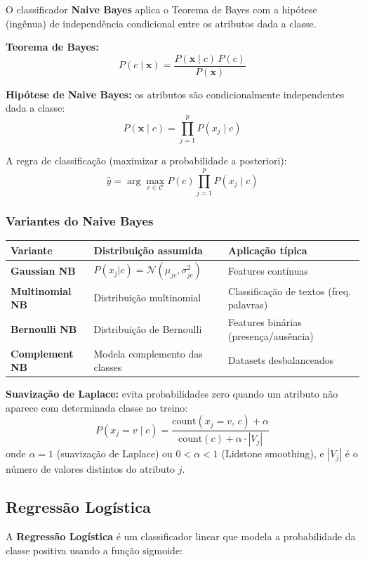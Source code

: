 \documentclass[12pt,a4paper]{article}
\begin{document}
O classificador \textbf{Naive Bayes} aplica o Teorema de Bayes com a hipótese (ingênua) de independência condicional entre os atributos dada a classe.

\textbf{Teorema de Bayes:}
\[
  P(c \mid \mathbf{x}) = \frac{P(\mathbf{x} \mid c)\, P(c)}{P(\mathbf{x})}
\]

\textbf{Hipótese de Naive Bayes:} os atributos são condicionalmente independentes dada a classe:
\[
  P(\mathbf{x} \mid c) = \prod_{j=1}^{p} P(x_j \mid c)
\]

A regra de classificação (maximizar a probabilidade a posteriori):
\[
  \hat{y} = \arg\max_{c \in \mathcal{C}} P(c) \prod_{j=1}^{p} P(x_j \mid c)
\]

\subsubsection{Variantes do Naive Bayes}

\begin{tabular}{>{\bfseries}p{3.5cm}p{4cm}p{5cm}}
\toprule
Variante & Distribuição assumida & Aplicação típica \\
\midrule
Gaussian NB & $P(x_j|c) = \mathcal{N}(\mu_{jc}, \sigma^2_{jc})$ & Features contínuas \\
Multinomial NB & Distribuição multinomial & Classificação de textos (freq. palavras) \\
Bernoulli NB & Distribuição de Bernoulli & Features binárias (presença/ausência) \\
Complement NB & Modela complemento das classes & Datasets desbalanceados \\
\bottomrule
\end{tabular}

\vspace{0.5em}
\textbf{Suavização de Laplace:} evita probabilidades zero quando um atributo não aparece com determinada classe no treino:
\[
  P(x_j = v \mid c) = \frac{\text{count}(x_j = v,\, c) + \alpha}{\text{count}(c) + \alpha \cdot |V_j|}
\]
onde $\alpha = 1$ (suavização de Laplace) ou $0 < \alpha < 1$ (Lidstone smoothing), e $|V_j|$ é o número de valores distintos do atributo $j$.

\subsection{Regressão Logística}

A \textbf{Regressão Logística} é um classificador linear que modela a probabilidade da classe positiva usando a função sigmoide:
\end{document}
